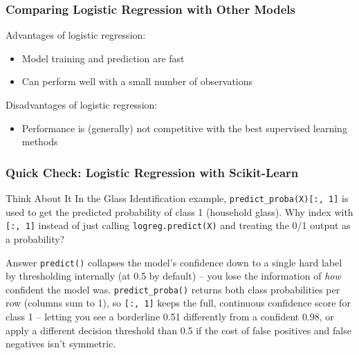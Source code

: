 \begin{frame}[fragile]\frametitle{Comparing Logistic Regression with Other Models}
Advantages of logistic regression:
\begin{itemize}
\item     Model training and prediction are fast
\item     Can perform well with a small number of observations
\end{itemize}
Disadvantages of logistic regression:
\begin{itemize}
\item     Performance is (generally) not competitive with the best supervised learning methods

\end{itemize}
\end{frame}

\begin{frame}[fragile]\frametitle{Quick Check: Logistic Regression with Scikit-Learn}
\begin{block}{Think About It}
In the Glass Identification example, \texttt{predict\_proba(X)[:, 1]} is used to get the predicted probability of class 1 (household glass). Why index with \texttt{[:, 1]} instead of just calling \texttt{logreg.predict(X)} and treating the 0/1 output as a probability?
\end{block}
\pause
\begin{block}{Answer}
\texttt{predict()} collapses the model's confidence down to a single hard label by thresholding internally (at 0.5 by default) -- you lose the information of \emph{how} confident the model was. \texttt{predict\_proba()} returns both class probabilities per row (columns sum to 1), so \texttt{[:, 1]} keeps the full, continuous confidence score for class 1 -- letting you see a borderline 0.51 differently from a confident 0.98, or apply a different decision threshold than 0.5 if the cost of false positives and false negatives isn't symmetric.
\end{block}
\end{frame}


